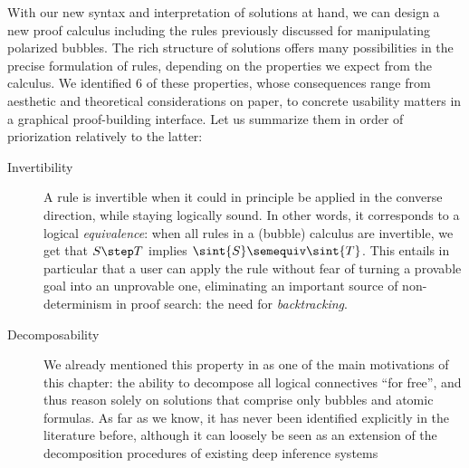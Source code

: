 With our new syntax and interpretation of solutions at hand, we can design a new
proof calculus including the rules previously discussed for manipulating
polarized bubbles. The rich structure of solutions offers many possibilities in
the precise formulation of rules, depending on the properties we expect from the
calculus. We identified 6 of these properties, whose consequences range from
aesthetic and theoretical considerations on paper, to concrete usability matters
in a graphical proof-building interface. Let us summarize them in order of
priorization relatively to the latter:
\begin{description}
  \item[Invertibility]
    A rule is invertible when it could in principle be applied in the converse
    direction, while staying logically sound. In other words, it corresponds to
    a logical \emph{equivalence}: when all rules in a (bubble) calculus are
    invertible, we get that $S \step T$ implies $\sint{S} \semequiv
    \sint{T}$. This entails in particular that a user can apply the rule
    without fear of turning a provable goal into an unprovable
    one, eliminating an important source of
    non-determinism in proof search: the need for
    \emph{backtracking}.
  \item[Decomposability]
    We already mentioned this property in  as one of the
    main motivations of this chapter: the ability to decompose all logical
    connectives ``for free'', and thus reason solely on solutions that comprise
    only bubbles and atomic formulas. As far as we know, it has never been
    identified explicitly in the literature before, although it can loosely be
    seen as an extension of the decomposition procedures of existing deep
    inference systems
\end{description}
